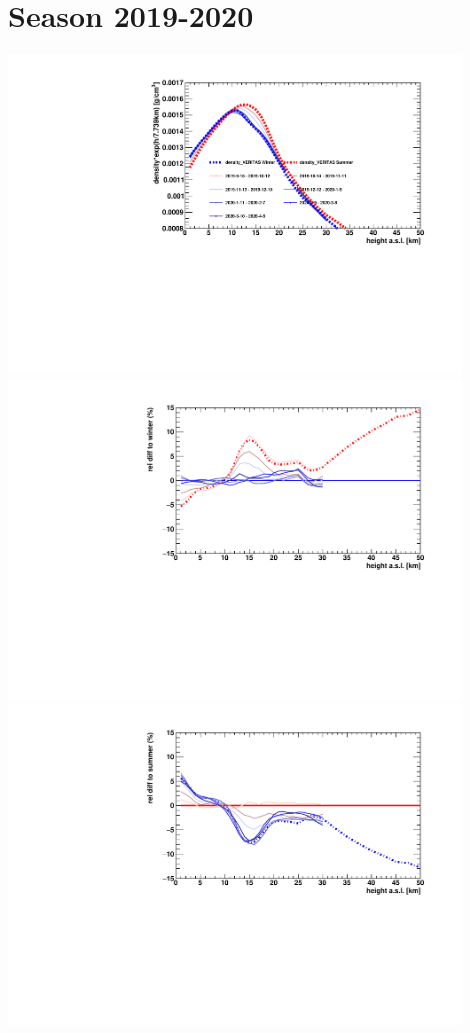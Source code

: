 \section*{Season 2019-2020}
\noindent\begin{minipage}{\textwidth}
\centering
\includegraphics[width=0.9\textwidth]{season-2019-2020-density.pdf}
\includegraphics[width=0.9\textwidth]{season-relativeWinter-2019-2020-density.pdf}
\includegraphics[width=0.9\textwidth]{season-relativeSummer-2019-2020-density.pdf}
\end{minipage}
